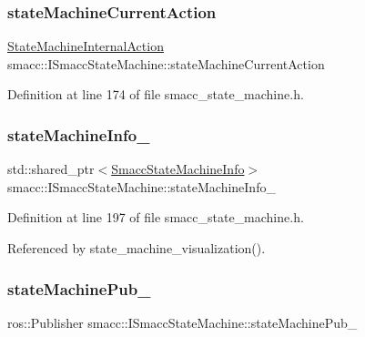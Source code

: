 \subsubsection{\texorpdfstring{state\+Machine\+Current\+Action}{stateMachineCurrentAction}}
{\footnotesize\ttfamily \hyperlink{namespacesmacc_a0889aff43c93fe5285109819d2898144}{State\+Machine\+Internal\+Action} smacc\+::\+I\+Smacc\+State\+Machine\+::state\+Machine\+Current\+Action\hspace{0.3cm}{\ttfamily [private]}}



Definition at line 174 of file smacc\+\_\+state\+\_\+machine.\+h.

\mbox{\label{classsmacc_1_1ISmaccStateMachine_a0914aa27c3f51374c338d89a32b135d1}} 
\subsubsection{\texorpdfstring{state\+Machine\+Info\+\_\+}{stateMachineInfo\_}}
{\footnotesize\ttfamily std\+::shared\+\_\+ptr$<$\hyperlink{classsmacc_1_1introspection_1_1SmaccStateMachineInfo}{Smacc\+State\+Machine\+Info}$>$ smacc\+::\+I\+Smacc\+State\+Machine\+::state\+Machine\+Info\+\_\+\hspace{0.3cm}{\ttfamily [private]}}



Definition at line 197 of file smacc\+\_\+state\+\_\+machine.\+h.



Referenced by state\+\_\+machine\+\_\+visualization().

\mbox{\label{classsmacc_1_1ISmaccStateMachine_af4aa9fed70bd4c57b19e3370fbd25de7}} 
\subsubsection{\texorpdfstring{state\+Machine\+Pub\+\_\+}{stateMachinePub\_}}
{\footnotesize\ttfamily ros\+::\+Publisher smacc\+::\+I\+Smacc\+State\+Machine\+::state\+Machine\+Pub\+\_\+\hspace{0.3cm}{\ttfamily [protected]}}



